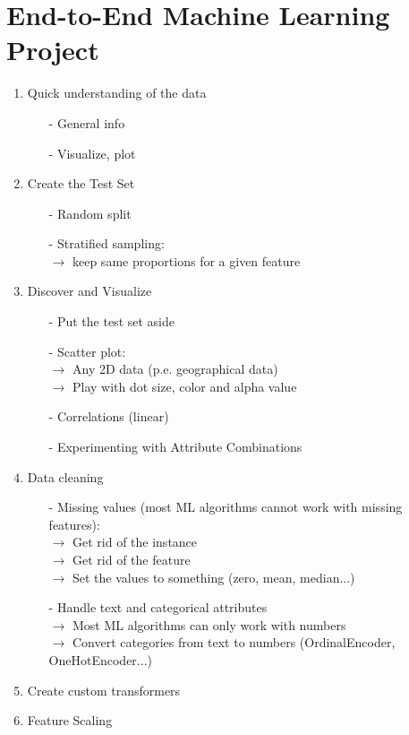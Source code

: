 \documentclass[french]{article}
\begin{document}
\section{End-to-End Machine Learning Project}

\begin{enumerate}

\item Quick understanding of the data
    \begin{itemize}
        \item[-] General info
        \item[-] Visualize, plot
    \end{itemize}
\item Create the Test Set
    \begin{itemize}
        \item[-] Random split
        \item[-] Stratified sampling: \\
             $\rightarrow$ keep same proportions for a given feature
    \end{itemize}
\item Discover and Visualize
    \begin{itemize}
        \item[-] Put the test set aside
        \item[-] Scatter plot: \\
             $\rightarrow$ Any 2D data (p.e. geographical data) \\
             $\rightarrow$ Play with dot size, color and alpha value
        \item[-] Correlations (linear)
        \item[-] Experimenting with Attribute Combinations
    \end{itemize}
\item Data cleaning
    \begin{itemize}
        \item[-] Missing values (most ML algorithms cannot work with missing features):\\
             $\rightarrow$ Get rid of the instance \\
             $\rightarrow$ Get rid of the feature \\
             $\rightarrow$ Set the values to something (zero, mean, median...)
        \item[-] Handle text and categorical attributes \\
             $\rightarrow$ Most ML algorithms can only work with numbers \\
             $\rightarrow$ Convert categories from text to numbers (OrdinalEncoder, OneHotEncoder...)
    \end{itemize}
\item Create custom transformers
\item Feature Scaling

\end{enumerate}
\end{document}
